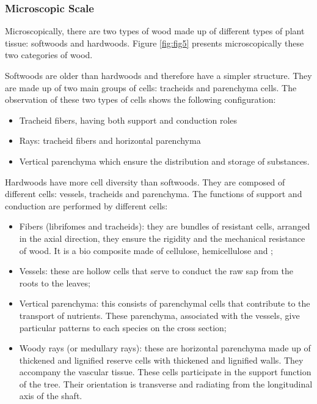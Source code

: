 \subsubsection{Microscopic Scale}

Microscopically, there are two types of wood made up of different types of plant tissue: softwoods and hardwoods. Figure \ref{fig:fig5} presents microscopically these two categories of wood.

Softwoods are older than hardwoods and therefore have a simpler structure. They are made up of two main groups of cells: tracheids and parenchyma cells. The observation of these two types of cells shows the following configuration:

\begin{itemize}
	\item Tracheid fibers, having both support and conduction roles
	\item Rays: tracheid fibers and horizontal parenchyma
	\item Vertical parenchyma which ensure the distribution and storage of substances.
\end{itemize}

Hardwoods have more cell diversity than softwoods. They are composed of different cells: vessels, tracheids and parenchyma. The functions of support and conduction are performed by different cells:

\begin{itemize}
	\item Fibers (librifomes and tracheids): they are bundles of resistant cells, arranged in the axial direction, they ensure the rigidity and the mechanical resistance of wood. It is a bio composite made of cellulose, hemicellulose and ;
	\item Vessels: these are hollow cells that serve to conduct the raw sap from the roots to the leaves;
	\item Vertical parenchyma: this consists of parenchymal cells that contribute to the transport of nutrients. These parenchyma, associated with the vessels, give particular patterns to each species on the cross section;
	\item Woody rays (or medullary rays): these are horizontal parenchyma made up of thickened and lignified reserve cells with thickened and lignified walls. They accompany the vascular tissue. These cells participate in the support function of the tree. Their orientation is transverse and radiating from the longitudinal axis of the shaft.
\end{itemize}


